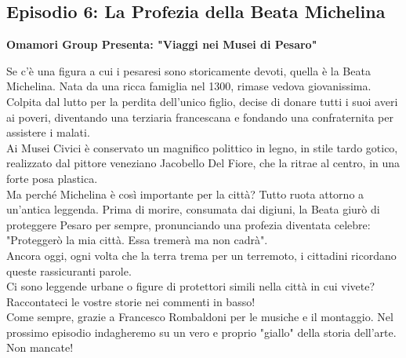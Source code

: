 \documentclass[hidelinks,12pt,a4paper]{article}
\begin{document}
\begin{flushleft}
		\subsection{Episodio 6: La Profezia della Beata Michelina}
		\begin{center}
			\textbf{Omamori Group Presenta: "Viaggi nei Musei di Pesaro"}
		\end{center}
		Se c'è una figura a cui i pesaresi sono storicamente devoti, quella è la Beata Michelina. Nata da una ricca famiglia nel 1300, rimase vedova giovanissima. Colpita dal lutto per la perdita dell'unico figlio, decise di donare tutti i suoi averi ai poveri, diventando una terziaria francescana e fondando una confraternita per assistere i malati.\\
		Ai Musei Civici è conservato un magnifico polittico in legno, in stile tardo gotico, realizzato dal pittore veneziano Jacobello Del Fiore, che la ritrae al centro, in una forte posa plastica.\\
		Ma perché Michelina è così importante per la città? Tutto ruota attorno a un'antica leggenda. Prima di morire, consumata dai digiuni, la Beata giurò di proteggere Pesaro per sempre, pronunciando una profezia diventata celebre: "Proteggerò la mia città. Essa tremerà ma non cadrà".\\
		Ancora oggi, ogni volta che la terra trema per un terremoto, i cittadini ricordano queste rassicuranti parole.\\
		Ci sono leggende urbane o figure di protettori simili nella città in cui vivete? Raccontateci le vostre storie nei commenti in basso!\\
		Come sempre, grazie a Francesco Rombaldoni per le musiche e il montaggio. Nel prossimo episodio indagheremo su un vero e proprio "giallo" della storia dell'arte. Non mancate!\\
		

\end{flushleft}
\end{document}
